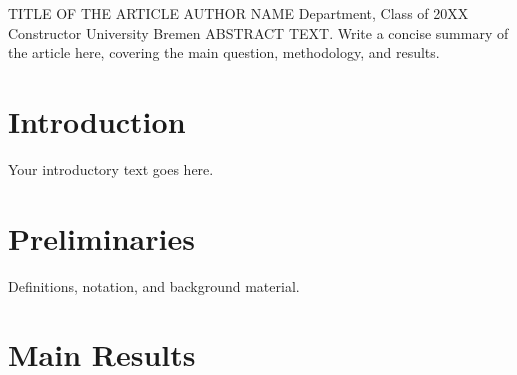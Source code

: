 %

\label{art:LABEL}

\articleheader
  {TITLE OF THE ARTICLE}           %
  {AUTHOR NAME}                    %
  {Department, Class of 20XX\\Constructor University Bremen}  %
  {ABSTRACT TEXT.  Write a concise summary of the article here,
   covering the main question, methodology, and results.}



\section{Introduction}

Your introductory text goes here.

\section{Preliminaries}

Definitions, notation, and background material.

\section{Main Results}

